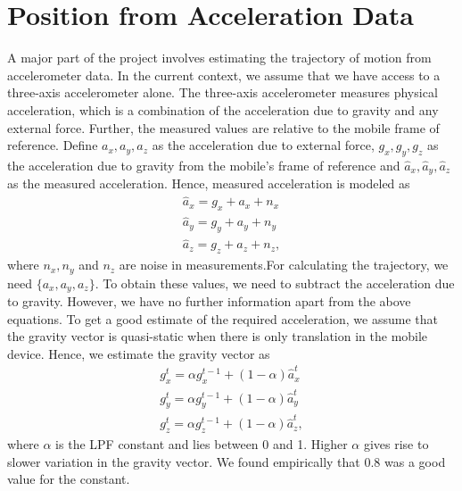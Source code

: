 \documentclass[BTech]{iitmdiss}
\begin{document}
\section{Position from Acceleration Data}
\label{basic_theory:accel}
A major part of the project involves estimating the trajectory of motion
from accelerometer data. In the current context, we assume that we have
access to a three-axis accelerometer alone. The three-axis accelerometer 
measures physical acceleration, which is a combination of the 
acceleration due to gravity and any external force. Further, the 
measured values are relative to the mobile frame of reference. Define
${a_x, a_y, a_z}$ as the acceleration due to external force,
${g_x, g_y, g_z}$ as the acceleration due to gravity from the mobile's
frame of reference and ${\hat{a}_x, \hat{a}_y, \hat{a}_z}$ as the measured
acceleration. Hence, measured acceleration is modeled as
\begin{align}
\hat{a}_x= g_x + a_x + n_x\\
\hat{a}_y= g_y + a_y + n_y\\
\hat{a}_z= g_z + a_z + n_z,
\end{align}
where $n_x, n_y$ and $n_z$ are noise in measurements.For calculating
the trajectory, we need $\{a_x,a_y,a_z\}$. To obtain 
these values, we need to subtract the acceleration due to gravity. 
However, we have no further information apart from the above equations.
To get a good estimate of the required acceleration, we assume that the
gravity vector is quasi-static when there is only translation in the 
mobile device. Hence, we estimate the gravity vector as
\begin{align}
g_x^t= \alpha{g_x^{t-1}} + (1-\alpha)\hat{a}_x^t\\
g_y^t= \alpha{g_y^{t-1}} + (1-\alpha)\hat{a}_y^t\\
g_z^t= \alpha{g_z^{t-1}} + (1-\alpha)\hat{a}_z^t,
\end{align}
where $\alpha$ is the LPF constant and lies between 0 and 1. Higher
$\alpha$ gives rise to slower variation in the gravity vector. We found
empirically that $0.8$ was a good value for the constant.
\end{document}
